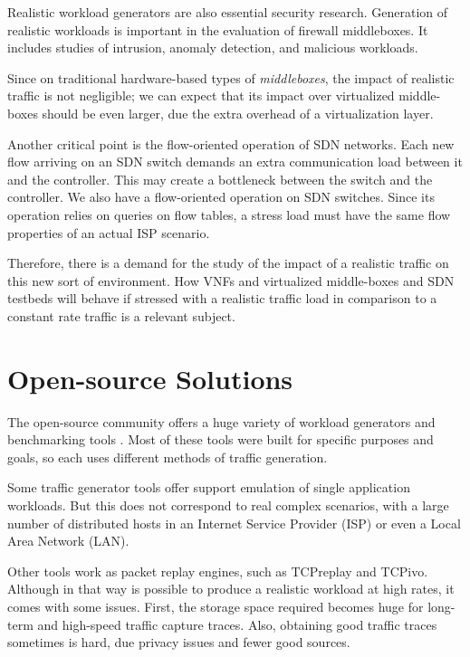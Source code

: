 Realistic workload generators are also essential security research\cite{ditg-paper}.  Generation of realistic workloads is important in the evaluation of firewall middleboxes. It includes studies of intrusion, anomaly detection, and malicious workloads\cite{ditg-paper}. 

Since on traditional hardware-based types of \textit{middleboxes}, the impact of realistic traffic is not negligible; we can expect that its impact over virtualized middle-boxes should be even larger, due the extra overhead of a virtualization layer. 


Another critical point is the flow-oriented operation of SDN networks. Each new flow arriving on an SDN switch demands an extra communication load between it and the controller. This may create a bottleneck between the switch and the controller.  We also have a flow-oriented operation on SDN switches. Since its operation relies on queries on flow tables, a stress load must have the same flow properties of an actual ISP scenario.


Therefore, there is a demand for the study of the impact of a realistic traffic on this new sort of environment. How VNFs and virtualized middle-boxes and SDN testbeds will behave if stressed with a realistic traffic load in comparison to a constant rate traffic is a relevant subject. 


\section{Open-source Solutions}


The open-source community offers a huge variety of workload generators and benchmarking tools \cite{ditg-paper}\cite{validate-trafficgen}\cite{comparative-trafficgen-tools}\cite{performance-trafficgen}. Most of these tools were built for specific purposes and goals, so each uses different methods of traffic generation. 


Some traffic generator tools offer support emulation of single application workloads. But this does not correspond to real complex scenarios, with a large number of distributed hosts in an Internet Service Provider (ISP) or even a Local Area Network (LAN).


Other tools work as packet replay engines, such as TCPreplay and TCPivo. Although in that way is possible to produce a realistic workload at high rates, it comes with some issues. First, the storage space required becomes huge for long-term and high-speed traffic capture traces. Also, obtaining good traffic traces sometimes is hard, due privacy issues and fewer good sources. 


